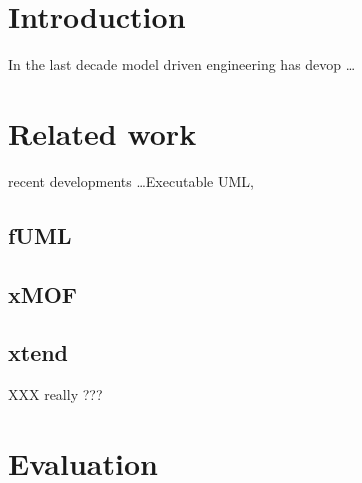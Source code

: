 \documentclass{llncs}
\begin{document}
\tableofcontents
\newpage


\section{Introduction}
In the last decade model driven engineering has devop  \dots



\section{Related work}

 recent developments  \dots Executable UML, 

\subsection{fUML}
\subsection{xMOF}
\subsection{xtend}
XXX really ???





\section{Evaluation}
\end{document}
